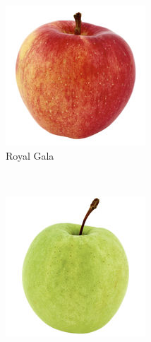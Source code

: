 \begin{figure}[t]
\begin{minipage}[b]{0.47\textwidth}
\begin{subfigure}[t]{0.32\textwidth}
			\includegraphics[width=\textwidth]{PaperA/clean-image-figure/Royal-Gala-Apple_Clean.jpg}
			\caption{Royal Gala}
			\label{subfig:clean-image-a}
		\end{subfigure}~
		\begin{subfigure}[t]{0.32\textwidth}
			\centering
			\includegraphics[width=\textwidth]{PaperA/clean-image-figure/Golden-Delicious-Apple_Clean.jpg}

\end{subfigure}
\end{minipage}
\end{figure}
